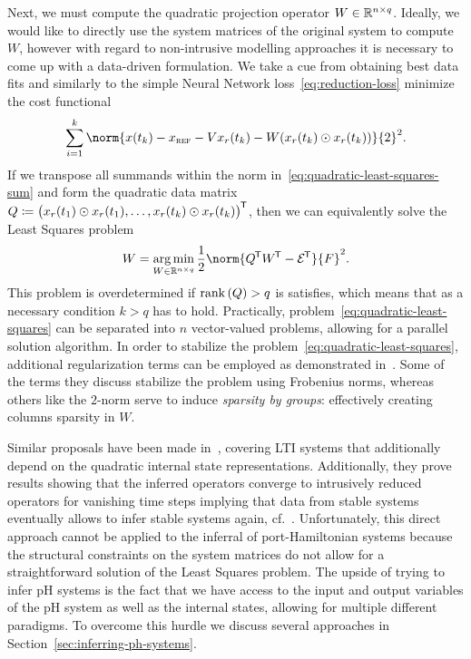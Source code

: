 Next, we must compute the quadratic projection operator $W \in \mathbb{R}^{n \times q}$.
Ideally, we would like to directly use the system matrices of the original system to compute $W$, however with regard to non-intrusive modelling approaches it is necessary to come up with a data-driven formulation.
We take a cue from obtaining best data fits and similarly to the simple Neural Network loss~\eqref{eq:reduction-loss} minimize the cost functional
\begin{equation}\label{eq:quadratic-least-squares-sum}
    \sum\limits_{i = 1}^k \norm{x(t_k) - x_\msc{ref} - V x_r(t_k) - W (x_r(t_k) \odot x_r(t_k))}{2}^2.
\end{equation}
If we transpose all summands within the norm in~\eqref{eq:quadratic-least-squares-sum} and form the quadratic data matrix $Q \coloneqq {\big( x_r(t_1) \odot x_r(t_1), \dots, x_r(t_k) \odot x_r(t_k) \big)}^{\mkern-1.5mu \mathsf{T}}$, then we can equivalently solve the Least Squares problem
\begin{equation}\label{eq:quadratic-least-squares}
    W = \argmin\limits_{W \in \bb{R}^{n \times q}} \frac{1}{2} \norm{Q\trans W\trans - \mcl{E}\trans}{F}^2.
\end{equation}
This problem is overdetermined if $\mathop{}\!\mathrm{rank}\left(Q\right) > q$ is satisfies, which means that as a necessary condition $k > q$ has to hold.
Practically, problem~\eqref{eq:quadratic-least-squares} can be separated into $n$ vector-valued problems, allowing for a parallel solution algorithm.
In order to stabilize the problem~\eqref{eq:quadratic-least-squares}, additional regularization terms can be employed as demonstrated in~\cite[Equation~15]{Geelen2023}.
Some of the terms they discuss stabilize the problem using Frobenius norms, whereas others like the $2$-norm serve to induce \emph{sparsity by groups}: effectively creating columns sparsity in $W$.



Similar proposals have been made in~\cite{Peherstorfer2016}, covering LTI systems that additionally depend on the quadratic internal state representations.
Additionally, they prove results showing that the inferred operators converge to intrusively reduced operators for vanishing time steps implying that data from stable systems eventually allows to infer stable systems again, cf.~\cite[Theorem~1, Corollary~1]{Peherstorfer2016}.
Unfortunately, this direct approach cannot be applied to the inferral of port-Hamiltonian systems because the structural constraints on the system matrices do not allow for a straightforward solution of the Least Squares problem.
The upside of trying to infer pH systems is the fact that we have access to the input and output variables of the pH system as well as the internal states, allowing for multiple different paradigms.
To overcome this hurdle we discuss several approaches in Section~\ref{sec:inferring-ph-systems}.
